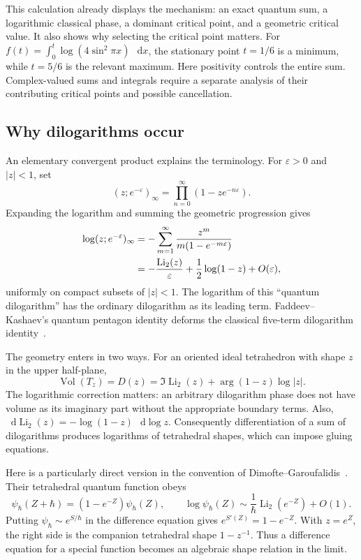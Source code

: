 \documentclass[11pt,a4paper]{article}
\numberwithin{equation}{section}
\theoremstyle{definition}
\theoremstyle{remark}
\DeclareMathOperator{\Vol}{Vol}
\newcommand{\dd}{\mathop{}\!\mathrm d}
\begin{document}
This calculation already displays the mechanism: an exact quantum
sum, a logarithmic classical phase, a dominant critical point,
and a geometric critical value. It also shows why selecting the
critical point matters. For
$f(t)=\int_0^t\log(4\sin^2\pi x)\,\dd x$, the stationary point
$t=1/6$ is a minimum, while $t=5/6$ is the relevant maximum.
Here positivity controls the entire sum. Complex-valued sums and
integrals require a separate analysis of their contributing
critical points and possible cancellation.

\subsection{Why dilogarithms occur}
\label{sec:introdilog}

An elementary convergent product explains the terminology. For
$\varepsilon>0$ and $|z|<1$, set
\[
 (z;e^{-\varepsilon})_\infty
      =\prod_{n=0}^\infty(1-ze^{-n\varepsilon}).
\]
Expanding the logarithm and summing the geometric progression gives
\begin{align}
 \log(z;e^{-\varepsilon})_\infty
 &=-\sum_{m=1}^\infty
       \frac{z^m}{m(1-e^{-m\varepsilon})}\notag\\
 &=-\frac{\operatorname{Li}_2(z)}{\varepsilon}
       +\frac12\log(1-z)+O(\varepsilon),
 \label{eq:introqpochhammer}
\end{align}
uniformly on compact subsets of $|z|<1$.
The logarithm of this ``quantum dilogarithm'' has the ordinary
dilogarithm as its leading term. Faddeev--Kashaev's quantum
pentagon identity deforms the classical five-term dilogarithm
identity~\cite{FaddeevKashaev}.

The geometry enters in two ways. For an oriented ideal tetrahedron
with shape $z$ in the upper half-plane,
\begin{equation}
 \Vol(T_z)=D(z)
 =\Im\operatorname{Li}_2(z)+\arg(1-z)\log|z|.
 \label{eq:introBlochWigner}
\end{equation}
The logarithmic correction matters: an arbitrary dilogarithm phase
does not have volume as its imaginary part without the appropriate
boundary terms. Also,
$\dd\operatorname{Li}_2(z)=-\log(1-z)\,\dd\log z$.
Consequently differentiation of a sum of dilogarithms produces
logarithms of tetrahedral shapes, which can impose gluing equations.

Here is a particularly direct version in the convention of
Dimofte--Garoufalidis~\cite[Section 5.1]{DimofteGaroufalidis}.
Their tetrahedral quantum function obeys
\begin{equation}
 \psi_\hbar(Z+\hbar)=(1-e^{-Z})\psi_\hbar(Z),\qquad
 \log\psi_\hbar(Z)\sim\frac1\hbar\operatorname{Li}_2(e^{-Z})+O(1).
 \label{eq:introquantumshape}
\end{equation}
Putting $\psi_\hbar\sim e^{S/\hbar}$ in the difference equation
gives $e^{S'(Z)}=1-e^{-Z}$. With $z=e^Z$, the right side is
the companion tetrahedral shape $1-z^{-1}$. Thus a difference
equation for a special function becomes an algebraic shape relation
in the limit.
\end{document}
